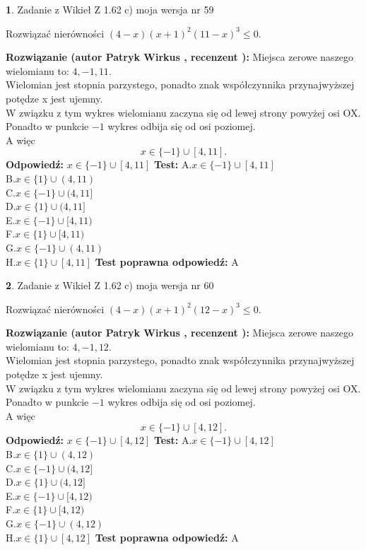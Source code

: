 \documentclass[12pt, a4paper]{article}
\theoremstyle{definition} %
\newtheorem{zad}{}
\newcommand{\zadStart}[1]{\begin{zad}#1\newline}
\newcommand{\zadStop}{\end{zad}}
\newcommand{\rozwStart}[2]{\noindent \textbf{Rozwiązanie (autor #1 , recenzent #2): }\newline}
\newcommand{\rozwStop}{\newline}
\newcommand{\odpStart}{\noindent \textbf{Odpowiedź:}\newline}
\newcommand{\odpStop}{\newline}
\newcommand{\testStart}{\noindent \textbf{Test:}\newline}
\newcommand{\testStop}{\newline}
\newcommand{\kluczStart}{\noindent \textbf{Test poprawna odpowiedź:}\newline}
\newcommand{\kluczStop}{\newline}
\begin{document}
\zadStart{Zadanie z Wikieł Z 1.62 c) moja wersja nr 59}

Rozwiązać nierówności $(4-x)(x+1)^{2}(11-x)^{3}\le0$.
\zadStop
\rozwStart{Patryk Wirkus}{}
Miejsca zerowe naszego wielomianu to: $4, -1, 11$.\\
Wielomian jest stopnia parzystego, ponadto znak współczynnika przy\linebreak najwyższej potędze x jest ujemny.\\ W związku z tym wykres wielomianu zaczyna się od lewej strony powyżej osi OX.\\
Ponadto w punkcie $-1$ wykres odbija się od osi poziomej.\\
A więc $$x \in \{-1\} \cup [4,11].$$
\rozwStop
\odpStart
$x \in \{-1\} \cup [4,11]$
\odpStop
\testStart
A.$x \in \{-1\} \cup [4,11]$\\
B.$x \in \{1\} \cup (4,11)$\\
C.$x \in \{-1\} \cup (4,11]$\\
D.$x \in \{1\} \cup (4,11]$\\
E.$x \in \{-1\} \cup [4,11)$\\
F.$x \in \{1\} \cup [4,11)$\\
G.$x \in \{-1\} \cup (4,11)$\\
H.$x \in \{1\} \cup [4,11]$
\testStop
\kluczStart
A
\kluczStop



\zadStart{Zadanie z Wikieł Z 1.62 c) moja wersja nr 60}

Rozwiązać nierówności $(4-x)(x+1)^{2}(12-x)^{3}\le0$.
\zadStop
\rozwStart{Patryk Wirkus}{}
Miejsca zerowe naszego wielomianu to: $4, -1, 12$.\\
Wielomian jest stopnia parzystego, ponadto znak współczynnika przy\linebreak najwyższej potędze x jest ujemny.\\ W związku z tym wykres wielomianu zaczyna się od lewej strony powyżej osi OX.\\
Ponadto w punkcie $-1$ wykres odbija się od osi poziomej.\\
A więc $$x \in \{-1\} \cup [4,12].$$
\rozwStop
\odpStart
$x \in \{-1\} \cup [4,12]$
\odpStop
\testStart
A.$x \in \{-1\} \cup [4,12]$\\
B.$x \in \{1\} \cup (4,12)$\\
C.$x \in \{-1\} \cup (4,12]$\\
D.$x \in \{1\} \cup (4,12]$\\
E.$x \in \{-1\} \cup [4,12)$\\
F.$x \in \{1\} \cup [4,12)$\\
G.$x \in \{-1\} \cup (4,12)$\\
H.$x \in \{1\} \cup [4,12]$
\testStop
\kluczStart
A
\kluczStop
\end{document}
